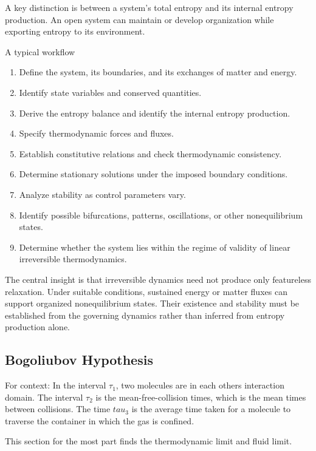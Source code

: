 A key distinction is between a system's total entropy
and its internal entropy production. An open system can
maintain or develop organization while exporting entropy
to its environment.

A typical workflow
\begin{enumerate}
    \item Define the system, its boundaries, and its
          exchanges of matter and energy.
    \item Identify state variables and conserved quantities.
    \item Derive the entropy balance and identify the
          internal entropy production.
    \item Specify thermodynamic forces and fluxes.
    \item Establish constitutive relations and check
          thermodynamic consistency.
    \item Determine stationary solutions under the
          imposed boundary conditions.
    \item Analyze stability as control parameters vary.
    \item Identify possible bifurcations, patterns,
          oscillations, or other nonequilibrium states.
    \item Determine whether the system lies within the
          regime of validity of linear irreversible
          thermodynamics.
\end{enumerate}


The central insight is that irreversible dynamics need
not produce only featureless relaxation. Under suitable
conditions, sustained energy or matter fluxes can support
organized nonequilibrium states. Their existence and
stability must be established from the governing
dynamics rather than inferred from entropy production
alone.

\subsection{Bogoliubov Hypothesis}

For context: In the interval $\tau_1$, two molecules are in each others interaction domain. The interval $\tau_2$ is the mean-free-collision times, which is the mean times between collisions. The time $tau_3$ is the average time taken for a molecule to traverse the container in which the gas is confined.

This section for the most part finds the thermodynamic limit and fluid limit.

